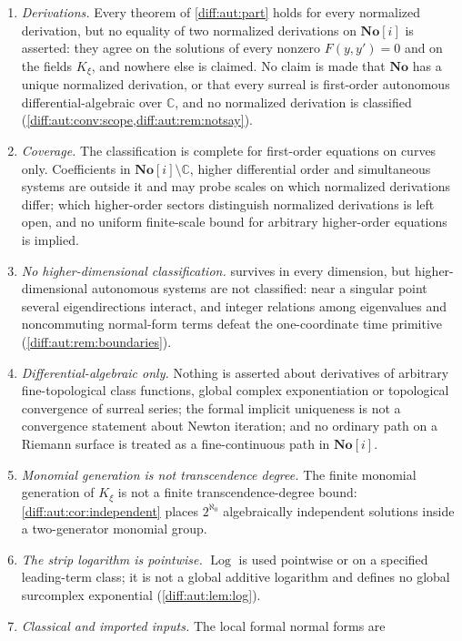 \documentclass[11pt,letterpaper]{article}
\numberwithin{equation}{section}
\theoremstyle{definition}
\theoremstyle{remark}
\newcommand{\No}{\mathbf{No}}
\newcommand{\SC}{\mathbf{No}[i]}
\newcommand{\C}{\mathbb C}
\newcommand{\Log}{\operatorname{Log}}
\begin{document}
\begin{enumerate}[label=\textup{N\arabic*.},leftmargin=3.0em,itemsep=0.35em,start=80]
\item \emph{Derivations.} Every theorem of \cref{diff:aut:part} holds for every
normalized derivation, but no equality of two normalized derivations on $\SC$ is
asserted: they agree on the solutions of every nonzero $F(y,y')=0$ and on the
fields $K_{\xi}$, and nowhere else is claimed. No claim is made that $\No$ has a
unique normalized derivation, or that every surreal is first-order autonomous
differential-algebraic over $\C$, and no normalized derivation is classified
(\cref{diff:aut:conv:scope,diff:aut:rem:notsay}).
\item \emph{Coverage.} The classification is complete for first-order equations
on curves only. Coefficients in $\SC\setminus\C$, higher differential order and
simultaneous systems are outside it and may probe scales on which normalized
derivations differ; which higher-order sectors distinguish normalized
derivations is left open, and no uniform finite-scale bound for arbitrary
higher-order equations is implied.
\item \emph{No higher-dimensional classification.} 
survives in every dimension, but higher-dimensional autonomous systems are not
classified: near a singular point several eigendirections interact, and integer
relations among eigenvalues and noncommuting normal-form terms defeat the
one-coordinate time primitive (\cref{diff:aut:rem:boundaries}).
\item \emph{Differential-algebraic only.} Nothing is asserted about derivatives
of arbitrary fine-topological class functions, global complex exponentiation or
topological convergence of surreal series; the formal implicit uniqueness is not
a convergence statement about Newton iteration; and no ordinary path on a
Riemann surface is treated as a fine-continuous path in $\SC$.
\item \emph{Monomial generation is not transcendence degree.} The finite
monomial generation of $K_{\xi}$ is not a finite transcendence-degree bound:
\cref{diff:aut:cor:independent} places $2^{\aleph_{0}}$ algebraically independent
solutions inside a two-generator monomial group.
\item \emph{The strip logarithm is pointwise.} $\Log$ is used pointwise or on a
specified leading-term class; it is not a global additive logarithm and defines
no global surcomplex exponential (\cref{diff:aut:lem:log}).
\item \emph{Classical and imported inputs.} The local formal normal forms are

\end{enumerate}
\end{document}
